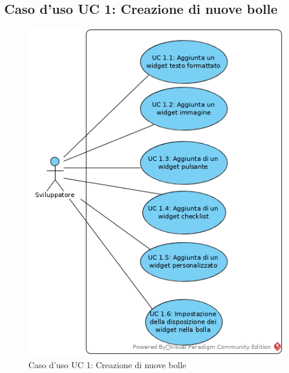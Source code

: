 \subsection{Caso d'uso UC 1: Creazione di nuove bolle}
\label{Caso d'uso UC 1: Creazione di nuove bolle}
\begin{figure}[ht]
	\centering
	\includegraphics[scale=0.80]{Usecases/img/UC1.png}
	\caption{Caso d'uso UC 1: Creazione di nuove bolle}
\end{figure}


